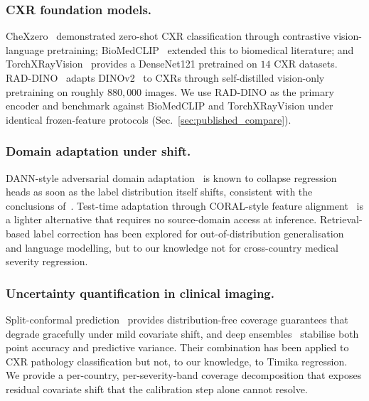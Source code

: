 \documentclass[runningheads]{llncs}
\begin{document}
\subsubsection{CXR foundation models.}
CheXzero~\cite{tiu2022chexzero} demonstrated zero-shot CXR classification through contrastive vision-language pretraining; BioMedCLIP~\cite{zhang2024biomedclip} extended this to biomedical literature; and TorchXRayVision~\cite{cohen2022torchxrayvision} provides a DenseNet121 pretrained on $14$ CXR datasets. RAD-DINO~\cite{perez2024raddino} adapts DINOv2~\cite{oquab2024dinov2} to CXRs through self-distilled vision-only pretraining on roughly $880{,}000$ images. We use RAD-DINO as the primary encoder and benchmark against BioMedCLIP and TorchXRayVision under identical frozen-feature protocols (Sec.~\ref{sec:published_compare}).

\subsubsection{Domain adaptation under shift.}
DANN-style adversarial domain adaptation~\cite{ganin2016domain} is known to collapse regression heads as soon as the label distribution itself shifts, consistent with the conclusions of~\cite{gulrajani2021domainbed}. Test-time adaptation through CORAL-style feature alignment~\cite{sun2016deepcoral} is a lighter alternative that requires no source-domain access at inference. Retrieval-based label correction has been explored for out-of-distribution generalisation~\cite{long2022retievalood} and language modelling, but to our knowledge not for cross-country medical severity regression.

\subsubsection{Uncertainty quantification in clinical imaging.}
Split-conformal prediction~\cite{angelopoulos2023conformalintro} provides distribution-free coverage guarantees that degrade gracefully under mild covariate shift, and deep ensembles~\cite{lakshminarayanan2017deepensembles} stabilise both point accuracy and predictive variance. Their combination has been applied to CXR pathology classification but not, to our knowledge, to Timika regression. We provide a per-country, per-severity-band coverage decomposition that exposes residual covariate shift that the calibration step alone cannot resolve.

\end{document}
